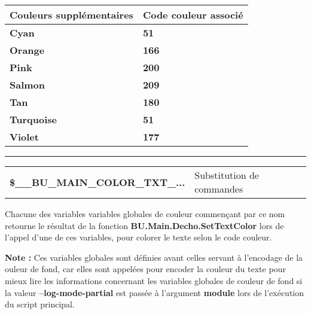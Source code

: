 \documentclass[a4paper,10pt]{article}
\begin{document}
\begin{justify}
    \begin{tabular}{|l|l|}
        \hline
        \textbf{Couleurs supplémentaires} & \textbf{Code couleur associé}\\
        \hline
        \textbf{\color{Cyan}Cyan} & \textbf{\color{Cyan}51}\\
        \hline
        \textbf{\color{Orange}Orange} & \textbf{\color{Orange}166}\\
        \hline
        \textbf{\color{Pink}Pink} & \textbf{\color{Pink}200}\\
        \hline
        \textbf{\color{Salmon}Salmon} & \textbf{\color{Salmon}209}\\
        \hline
        \textbf{\color{Tan}Tan} & \textbf{\color{Tan}180}\\
        \hline
        \textbf{\color{Turquoise}Turquoise} & \textbf{\color{Turquoise}51}\\
        \hline
        \textbf{\color{Violet}Violet} & \textbf{\color{Violet}177}\\
        \hline
    \end{tabular}
\end{justify}

\setlength{\parskip}{2em}


\par\noindent\rule{\textwidth}{0.4pt}

\setlength{\parskip}{1em}

\begin{justify}
    \begin{tabular}{l|l}
        \textbf{\color{vars}\$\_\_BU\_MAIN\_COLOR\_TXT\_...} & Substitution de commandes\\
    \end{tabular}
\end{justify}

\begin{justify}
    Chacune des variables variables globales de couleur commençant par ce nom retourne le résultat de la fonction \textbf{\color{func}BU.Main.Decho.SetTextColor} lors de l'appel d'une de ces variables, pour colorer le texte selon le code couleur.
\end{justify}

\begin{justify}
    \textbf{Note :} Ces variables globales sont définies avant celles servant à l'encodage de la ouleur de fond, car elles sont appelées pour encoder la couleur du texte pour mieux lire les informations concernant les variables globales de couleur de fond si la valeur \textbf{--log-mode-partial} est passée à l'argument \textbf{module} lors de l'exécution du script principal.
\end{justify}
\end{document}
